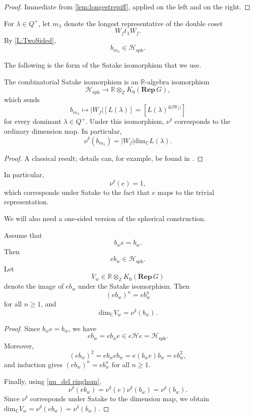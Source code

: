 \documentclass[a4paper,11pt]{amsart}
\newcommand{\C}{\mathbb{C}}
\newcommand{\R}{\mathbb{R}}
\newcommand{\Z}{\mathbb{Z}}
\renewcommand{\dim}[1][\C]{\mathrm{dim}_{#1}}
\newcommand{\ra}{\rightarrow}
\newcommand{\Hecke}{\mc H}
\newcommand{\Rep}{\mathbf{Rep}\,}
\newcommand{\mc}{\mathcal}
\numberwithin{equation}{subsection}
\theoremstyle{definition}
\theoremstyle{remark}
\begin{document}
\begin{proof}
Immediate from \autoref{lem:longestrepiff}, applied on the left and on the
right.
\end{proof}

For $\lambda\in Q^+$, let $m_\lambda$
denote the longest representative of the double coset
\[
W_f t_\lambda W_f.
\]
By \autoref{L:TwoSided},
\[
b_{m_\lambda}\in \Hecke_{\mathrm{sph}}.
\]

The following is the form of the Satake isomorphism that we use.

\begin{Lemma}\label{lem:satake}
The combinatorial Satake isomorphism is an $\R$-algebra isomorphism
\[
\Hecke_{\mathrm{sph}}
\ra
\R\otimes_{\Z} K_0(\Rep G),
\]
which sends
\[
b_{m_\lambda}
\longmapsto
|W_f|[L(\lambda)]
=
[L(\lambda)^{\oplus |W_f|}]
\]
for every dominant $\lambda\in Q^+$. Under this isomorphism,
$\nu^\delta$ corresponds to the ordinary dimension map. In particular,
\[
\nu^\delta(b_{m_\lambda})
=
|W_f|\dim L(\lambda).
\]
\end{Lemma}

\begin{proof}
A classical result; details can, for example, be found in
\cite{Kn-spherical-KL}.
\end{proof}

In particular,
\[
\nu^\delta(e)=1,
\]
which corresponds under Satake to the fact that $e$ maps to the trivial
representation.

We will also need a one-sided version of the spherical construction.

\begin{Lemma}\label{lem:satake-one-sided}
Assume that
\[
b_we=b_w.
\]
Then
\[
eb_w\in \Hecke_{\mathrm{sph}}.
\]
Let
\[
V_w\in \R\otimes_{\Z}K_0(\Rep G)
\]
denote the image of $eb_w$ under the Satake isomorphism. Then
\[
(eb_w)^n=eb_w^n
\]
for all $n\geq 1$, and
\[
\dim V_w=\nu^\delta(b_w).
\]
\end{Lemma}

\begin{proof}
Since \(b_we=b_w\), we have
\[
eb_w=eb_we\in e\Hecke e=\Hecke_{\mathrm{sph}}.
\]
Moreover,
\[
(eb_w)^2=eb_web_w=e(b_we)b_w=eb_w^2,
\]
and induction gives \((eb_w)^n=eb_w^n\) for all \(n\geq 1\).

Finally, using \autoref{nu_del ringhom},
\[
\nu^\delta(eb_w)
=
\nu^\delta(e)\nu^\delta(b_w)
=
\nu^\delta(b_w).
\]
Since \(\nu^\delta\) corresponds under Satake to the dimension map, we obtain
$\dim V_w
=
\nu^\delta(eb_w)
=
\nu^\delta(b_w)$.
\end{proof}
\end{document}
